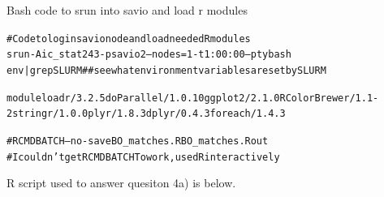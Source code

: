 \documentclass{article}\usepackage[]{graphicx}\usepackage[]{color}
\makeatletter
\newenvironment{kframe}{%
 \def\at@end@of@kframe{}%
 \ifinner\ifhmode%
  \def\at@end@of@kframe{\end{minipage}}%
  \begin{minipage}{\columnwidth}%
 \fi\fi%
 \def\FrameCommand##1{\hskip\@totalleftmargin \hskip-\fboxsep
 \colorbox{shadecolor}{##1}\hskip-\fboxsep
     \hskip-\linewidth \hskip-\@totalleftmargin \hskip\columnwidth}%
 \MakeFramed {\advance\hsize-\width
   \@totalleftmargin\z@ \linewidth\hsize
   \@setminipage}}%
 {\par\unskip\endMakeFramed%
 \at@end@of@kframe}
\newenvironment{knitrout}{}{} %
\makeatother
\begin{document}
Bash code to srun into savio and load r modules
\begin{knitrout}
\color{fgcolor}\begin{kframe}
\begin{alltt}
 
# Code to login savio node and load needed R modules
srun -A ic_stat243 -p savio2 --nodes=1 -t 1:00:00 --pty bash
env | grep SLURM  ## see what environment variables are set by SLURM

module load r/3.2.5 doParallel/1.0.10 ggplot2/2.1.0 RColorBrewer/1.1-2 stringr/1.0.0 plyr/1.8.3 dplyr/0.4.3  foreach/1.4.3  
    
#R CMD BATCH --no-save BO_matches.R BO_matches.Rout 
    #I couldn't get R CMD BATCH To work, used R interactively

\end{alltt}
\end{kframe}
\end{knitrout}

R script used to answer quesiton 4a) is below.
\end{document}
